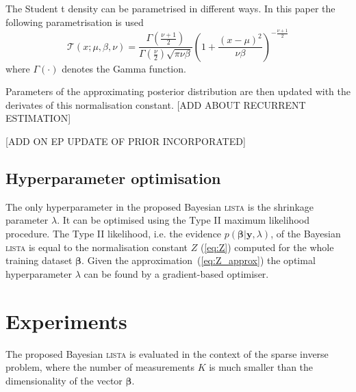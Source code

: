 \documentclass[letterpaper]{article}
\begin{document}
The Student t density can be parametrised in different ways. In this paper the following parametrisation is used 
\begin{equation}
\mathcal{T}(x; \mu, \beta, \nu) = \frac{\Gamma\left(\frac{\nu + 1}{2}\right)}{\Gamma\left(\frac{\nu}{2}\right)\sqrt{\pi \nu \beta}} \left(1 + \frac{(x - \mu)^2}{\nu\beta}\right)^{-\frac{\nu + 1}{2}}
\end{equation}
where $\Gamma(\cdot)$ denotes the Gamma function.

Parameters of the approximating posterior distribution are then updated with the derivates of this normalisation constant. [ADD ABOUT RECURRENT ESTIMATION]

[ADD ON EP UPDATE OF PRIOR INCORPORATED]

\subsection{Hyperparameter optimisation}
The only hyperparameter in the proposed Bayesian \textsc{lista} is the shrinkage parameter $\lambda$. It can be optimised using the Type II maximum likelihood procedure. The Type II likelihood, i.e. the evidence $p(\boldsymbol\beta | \mathbf{y}, \lambda)$, of the Bayesian \textsc{lista} is equal to the normalisation constant $Z$ (\ref{eq:Z}) computed for the whole training dataset $\boldsymbol\beta$. Given the approximation~(\ref{eq:Z_approx}) the optimal hyperparameter $\lambda$ can be found by a gradient-based optimiser.

\section{Experiments}
\label{sec:experiments}
The proposed Bayesian \textsc{lista} is evaluated in the context of the sparse inverse problem, where the number of measurements $K$ is much smaller than the dimensionality of the vector $\boldsymbol\beta$.
\end{document}
